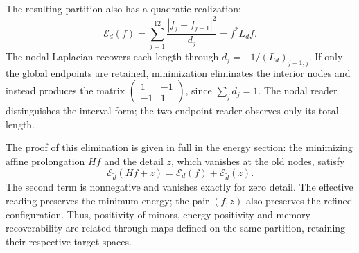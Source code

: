 The resulting partition also has a quadratic realization:
\[
 \mathcal E_d(f)=\sum_{j=1}^{12}\frac{|f_j-f_{j-1}|^2}{d_j}
 =f^*L_df.
\]
The nodal Laplacian recovers each length through
\(d_j=-1/(L_d)_{j-1,j}\). If only the global
endpoints are retained, minimization eliminates the interior nodes and instead
produces the matrix \(\left(\begin{smallmatrix}1&-1\\-1&1\end{smallmatrix}\right)\),
since \(\sum_jd_j=1\). The nodal reader distinguishes the interval form;
the two-endpoint reader observes only its total length.

The proof of this elimination is given in full in the energy
section: the minimizing affine prolongation \(Hf\) and the detail \(z\),
which vanishes at the old nodes, satisfy
\[
 \mathcal E_{\widetilde d}(Hf+z)
 =\mathcal E_d(f)+\mathcal E_{\widetilde d}(z).
\]
The second term is nonnegative and vanishes exactly for zero
detail. The effective reading preserves the minimum energy; the pair \((f,z)\)
also preserves the refined configuration. Thus, positivity of minors,
energy positivity and memory recoverability are related through
maps defined on the same partition, retaining their respective
target spaces.
